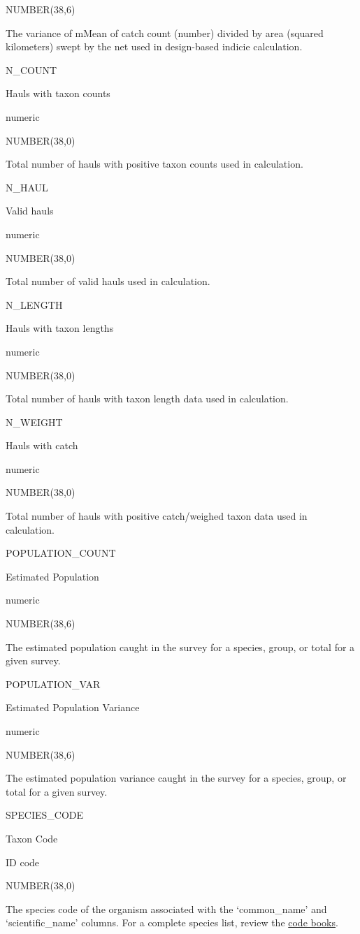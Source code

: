 \documentclass[
  letterpaper,
  oneside,
  open=any]{scrbook}
\begin{document}
NUMBER(38,6)

The variance of mMean of catch count (number) divided by area (squared
kilometers) swept by the net used in design-based indicie calculation.

N\_COUNT

Hauls with taxon counts

numeric

NUMBER(38,0)

Total number of hauls with positive taxon counts used in calculation.

N\_HAUL

Valid hauls

numeric

NUMBER(38,0)

Total number of valid hauls used in calculation.

N\_LENGTH

Hauls with taxon lengths

numeric

NUMBER(38,0)

Total number of hauls with taxon length data used in calculation.

N\_WEIGHT

Hauls with catch

numeric

NUMBER(38,0)

Total number of hauls with positive catch/weighed taxon data used in
calculation.

POPULATION\_COUNT

Estimated Population

numeric

NUMBER(38,6)

The estimated population caught in the survey for a species, group, or
total for a given survey.

POPULATION\_VAR

Estimated Population Variance

numeric

NUMBER(38,6)

The estimated population variance caught in the survey for a species,
group, or total for a given survey.

SPECIES\_CODE

Taxon Code

ID code

NUMBER(38,0)

The species code of the organism associated with the `common\_name' and
`scientific\_name' columns. For a complete species list, review the
\href{https://www.fisheries.noaa.gov/resource/document/groundfish-survey-species-code-manual-and-data-codes-manual}{code
books}.
\end{document}
